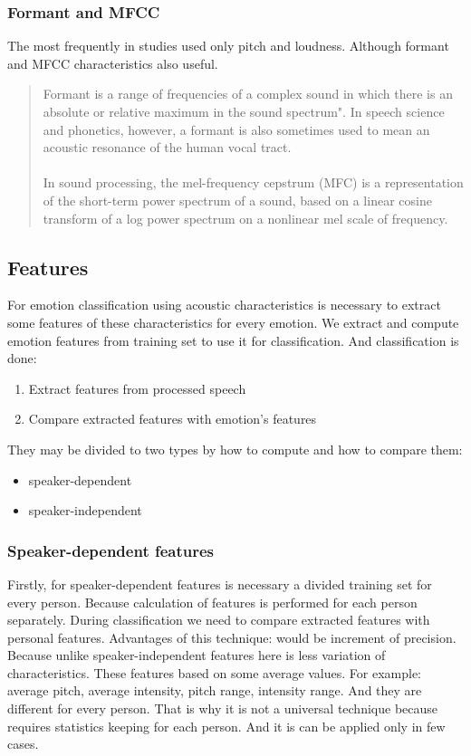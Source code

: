 \documentclass[14pt]{extarticle}
\begin{document}
\subsubsection{Formant and MFCC}
The most frequently in studies used only pitch and loudness. Although formant and MFCC characteristics also useful.
\begin{quote}
Formant is a range of frequencies of a complex sound in which there is an absolute or relative maximum in the sound spectrum". In speech science and phonetics, however, a formant is also sometimes used to mean an acoustic resonance of the human vocal tract.\cite{wiki2}
\\
\\
In sound processing, the mel-frequency cepstrum (MFC) is a representation of the short-term power spectrum of a sound, based on a linear cosine transform of a log power spectrum on a nonlinear mel scale of frequency\cite{wiki3}.
\end{quote}


\subsection{Features}
For emotion classification using acoustic characteristics is necessary to extract some features of these characteristics for every emotion. We extract and compute emotion features from training set to use it for classification. And classification is done:
\begin{enumerate}
	\item Extract features from processed speech
	\item Compare extracted features with emotion's features
\end{enumerate}

They may be divided to two types by how to compute and how to compare them:
\begin{itemize}
	\item speaker-dependent
	\item speaker-independent
\end{itemize}

\subsubsection{Speaker-dependent features}
Firstly, for speaker-dependent features is necessary a divided training set for every person. Because calculation of features is performed for each person separately. During classification we need to compare extracted features with personal features. Advantages of this technique: would be increment of precision. Because unlike speaker-independent features here is less variation of characteristics. These features based on some average values. For example: average pitch, average intensity, pitch range, intensity range. And they are different for every person. That is why it is not a universal technique because requires statistics keeping for each person. And it is can be applied only in few cases.
\end{document}
